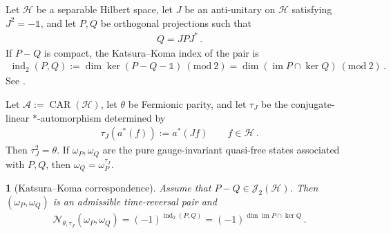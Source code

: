 \documentclass[a4paper,10pt]{article}
\numberwithin{equation}{section}
\theoremstyle{plain}
\newtheorem{thm}{\protect\theoremname}[section]
\theoremstyle{plain}
\theoremstyle{plain}
\theoremstyle{plain}
\theoremstyle{plain}
\theoremstyle{remark}
\theoremstyle{definition}
\providecommand{\theoremname}{Theorem}
\newcommand{\calA}{\mathcal{A}}
\newcommand{\calN}{\mathcal{N}}
\newcommand{\calH}{\mathcal{H}}
\newcommand{\calJ}{\mathcal{J}}
\newcommand{\Id}{\mathds{1}}
\newcommand{\findex}{\operatorname{ind}}
\newcommand{\im}{\operatorname{im}}
\newcommand{\eq}[1]{\begin{align*}#1\end{align*}}
\newcommand{\eql}[1]{\begin{align}#1\end{align}}
\newcommand{\br}[1]{\left(#1\right)}
\newcommand{\Mod}[1]{\ (\mathrm{mod}\ #1)}
\begin{document}
Let $\calH$ be a separable Hilbert space, let $J$ be an anti-unitary on
$\calH$ satisfying $J^2=-\Id$, and let $P,Q$ be orthogonal projections
such that
\eq{
    Q=JPJ^*\,.
}
If $P-Q$ is compact, the Katsura--Koma index of the pair is
\eql{
    \findex_2(P,Q)
    :=
    \dim\ker\br{P-Q-\Id}\Mod{2}
    =
    \dim\br{\im P\cap\ker Q}\Mod{2}
    \label{eq:Katsura Koma pair index}\,.
}
See \cite{KatsuraKoma2016}.

Let $\calA:=\operatorname{CAR}(\calH)$, let $\theta$ be Fermionic
parity, and let $\tau_J$ be the conjugate-linear $*$-automorphism
determined by
\eql{
    \tau_J\br{a^*(f)}
    :=
    a^*(Jf)
    \qquad f\in\calH
    \label{eq:antiunitary induced CAR automorphism}\,.
}
Then $\tau_J^2=\theta$. If $\omega_P,\omega_Q$ are the pure
gauge-invariant quasi-free states associated with $P,Q$, then
$\omega_Q=\omega_P^{\tau_J}$.

\begin{thm}[Katsura--Koma correspondence]
\label{thm:Katsura Koma pure state correspondence}
Assume that $P-Q\in\calJ_2(\calH)$. Then
$(\omega_P,\omega_Q)$ is an admissible time-reversal pair and
\eql{
    \calN_{\theta,\tau_J}(\omega_P,\omega_Q)
    =
    \br{-1}^{\findex_2(P,Q)}
    =
    \br{-1}^{\dim\im P\cap\ker Q}
    \label{eq:Katsura Koma pure state equality}\,.
}
\end{thm}
\end{document}
